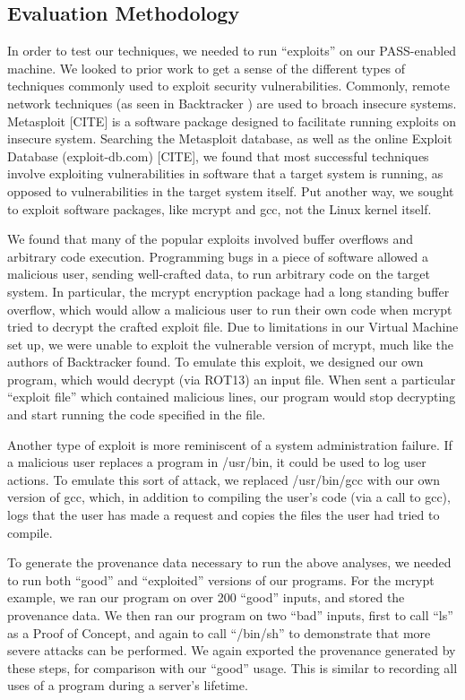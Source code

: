 \documentclass[10pt,twocolumn]{article}
\begin{document}
\subsection{Evaluation Methodology}
In order to test our techniques, we needed to run “exploits” on our PASS-enabled machine. We looked to prior work to get a sense of the different types of techniques commonly used to exploit security vulnerabilities. Commonly, remote network techniques (as seen in Backtracker \cite{backtracker}) are used to broach insecure systems. Metasploit [CITE] is a software package designed to facilitate running exploits on insecure system. Searching the Metasploit database, as well as the online Exploit Database (exploit-db.com) [CITE], we found that most successful techniques involve exploiting vulnerabilities in software that a target system is running, as opposed to vulnerabilities in the target system itself. Put another way, we sought to exploit software packages, like mcrypt and gcc, not the Linux kernel itself. 

We found that many of the popular exploits involved buffer overflows and arbitrary code execution. Programming bugs in a piece of software allowed a malicious user, sending well-crafted data, to run arbitrary code on the target system. In particular, the mcrypt encryption package had a long standing buffer overflow, which would allow a malicious user to run their own code when mcrypt tried to decrypt the crafted exploit file. Due to limitations in our Virtual Machine set up, we were unable to exploit the vulnerable version of mcrypt, much like the authors of Backtracker \cite{backtracker} found. To emulate this exploit, we designed our own program, which would decrypt (via ROT13) an input file. When sent a particular “exploit file” which contained malicious lines, our program would stop decrypting and start running the code specified in the file.

Another type of exploit is more reminiscent of a system administration failure. If a malicious user replaces a program in /usr/bin, it could be used to log user actions. To emulate this sort of attack, we replaced /usr/bin/gcc with our own version of gcc, which, in addition to compiling the user’s code (via a call to gcc), logs that the user has made a request and copies the files the user had tried to compile. 

To generate the provenance data necessary to run the above analyses, we needed to run both “good” and “exploited” versions of our programs. For the mcrypt example, we ran our program on over 200 “good” inputs, and stored the provenance data. We then ran our program on two “bad” inputs, first to call “ls” as a Proof of Concept, and again to call “/bin/sh” to demonstrate that more severe attacks can be performed. We again exported the provenance generated by these steps, for comparison with our “good” usage. This is similar to recording all uses of a program during a server’s lifetime. 
\end{document}
